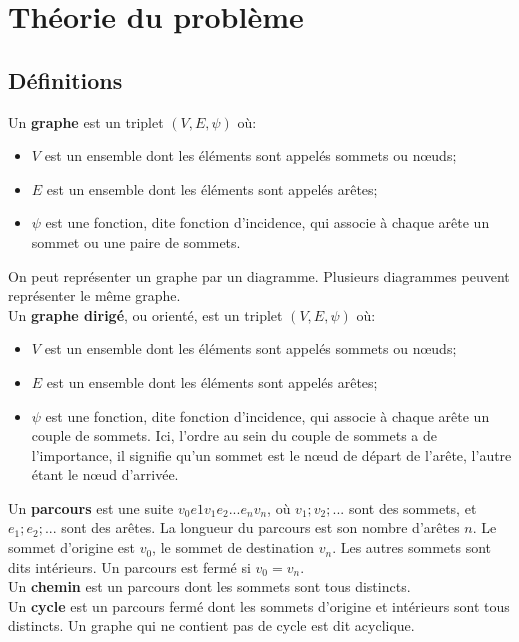 \section{Théorie du problème}

\subsection{Définitions}
Un \textbf{graphe} est un triplet $(V,E,\psi)$ où:
\begin{itemize}
\item $V$ est un ensemble dont les éléments sont appelés sommets ou nœuds;
\item $E$ est un ensemble dont les éléments sont appelés arêtes;
\item $\psi$ est une fonction, dite fonction d'incidence, qui associe à chaque arête un sommet ou une paire de sommets.
\end{itemize}
On peut représenter un graphe par un diagramme. Plusieurs diagrammes peuvent représenter le même graphe.\\

Un \textbf{graphe dirigé}, ou orienté, est un triplet $(V,E,\psi)$ où:
\begin{itemize}
\item $V$ est un ensemble dont les éléments sont appelés sommets ou nœuds;
\item $E$ est un ensemble dont les éléments sont appelés arêtes;
\item $\psi$ est une fonction, dite fonction d'incidence, qui associe à chaque arête un couple de sommets. Ici, l'ordre au sein du couple de sommets a de l'importance, il signifie qu'un sommet est le nœud de départ de l'arête, l'autre étant le nœud d'arrivée.\\
\end{itemize}

Un \textbf{parcours} est une suite $v_0e1v_1e_2...e_nv_n$, où $v_1;v_2;...$ sont des sommets, et $e_1;e_2;...$ sont des arêtes. La longueur du parcours est son nombre d'arêtes $n$. Le sommet d'origine est $v_0$, le sommet de destination $v_n$. Les autres sommets sont dits intérieurs. Un parcours est fermé si $v_0 = v_n$.\\

Un \textbf{chemin} est un parcours dont les sommets sont tous distincts.\\

Un \textbf{cycle} est un parcours fermé dont les sommets d'origine et intérieurs sont tous distincts. Un graphe qui ne contient pas de cycle est dit acyclique.
